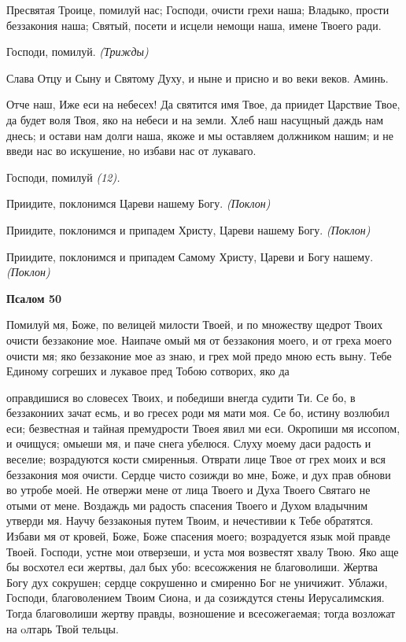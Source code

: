    Пресвятая Троице, помилуй нас; Господи, очисти грехи наша; Владыко,
прости беззакония наша; Святый, посети и исцели немощи наша, имене
Твоего ради.



   Господи, помилуй. \itshape  (Трижды)\normalfont{}



   Слава Отцу и Сыну и Святому Духу, и ныне и присно и во веки веков.
Аминь.



   Отче наш, Иже еси на небесех! Да святится имя Твое, да приидет
Царствие Твое, да будет воля Твоя, яко на небеси и на земли. Хлеб наш
насущный даждь нам днесь; и остави нам долги наша, якоже и мы оставляем
должником нашим; и не введи нас во искушение, но избави нас от
лукаваго.



   Господи, помилуй \itshape (12)\normalfont{}.



   Приидите, поклонимся Цареви нашему Богу. \itshape (Поклон)\normalfont{}



   Приидите, поклонимся и припадем Христу, Цареви нашему Богу.
\itshape (Поклон)\normalfont{}



   Приидите, поклонимся и припадем Самому Христу, Цареви и Богу
нашему. \itshape (Поклон)\normalfont{}



 

\bfseries Псалом 50\normalfont{}


   Помилуй мя, Боже, по велицей милости Твоей, и по множеству щедрот
Твоих очисти беззаконие мое. Наипаче омый мя от беззакония моего, и от
греха моего очисти мя; яко беззаконие мое аз знаю, и грех мой предо мною
есть выну. Тебе Единому согреших и лукавое пред Тобою сотворих, яко да

оправдишися во словесех Твоих, и победиши внегда судити Ти. Се бо, в
беззакониих зачат есмь, и во гресех роди мя мати моя. Се бо, истину
возлюбил еси; безвестная и тайная премудрости Твоея явил ми еси.
Окропиши мя иссопом, и очищуся; омыеши мя, и паче снега убелюся. Слуху
моему даси радость и веселие; возрадуются кости смиренныя. Отврати лице
Твое от грех моих и вся беззакония моя очисти. Сердце чисто созижди во
мне, Боже, и дух прав обнови во утробе моей. Не отвержи мене от
лица Твоего и Духа Твоего Святаго не отыми от мене. Воздаждь ми
радость спасения Твоего и Духом владычним утверди мя. Научу
беззаконыя путем Твоим, и нечестивии к Тебе обратятся. Избави мя от
кровей, Боже, Боже спасения моего; возрадуется язык мой правде
Твоей. Господи, устне мои отверзеши, и уста моя возвестят хвалу
Твою. Яко аще бы восхотел еси жертвы, дал бых убо: всесожжения не
благоволиши. Жертва Богу дух сокрушен; сердце сокрушенно и смиренно
Бог не уничижит. Ублажи, Господи, благоволением Твоим Сиона, и
да созиждутся стены Иерусалимския. Тогда благоволиши жертву
правды, возношение и всесожегаемая; тогда возложат на oлтарь Твой
тельцы.



